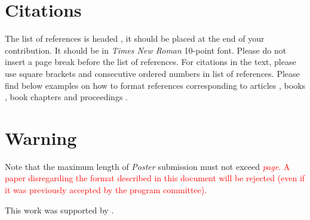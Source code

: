 \documentclass[poster, final]{jobim2017}
\begin{document}
\section{Citations}
\label{sec:citations}

The list of references is headed
\emph{\refname}, it should be placed at the end of your
contribution. It should be in \emph{Times New Roman} 10-point font. Please do not
insert a page break before the list of references. For citations in the text,
please use square brackets \cite{Sokal1996} and consecutive ordered numbers
\cite{GastelDay2016,Cormode2012} in list of references.
Please find below examples on how to format references corresponding to
articles \cite{Sokal1996}, books \cite{GastelDay2016}, book chapters and proceedings
\cite{Cormode2012}.

\section{Warning} 
Note that the maximum length of \emph{Poster} submission must not exceed \textcolor{red}{\emph{\JobimPosterPaperMaxPages{} page}. A paper disregarding the
  format described in this document will be rejected (even if it was previously accepted 
  by the program committee).}


\begin{acknowledgements}
  \label{sec:acknowledgements}
  
 This work was supported by .
\end{acknowledgements}



 
\end{document}
